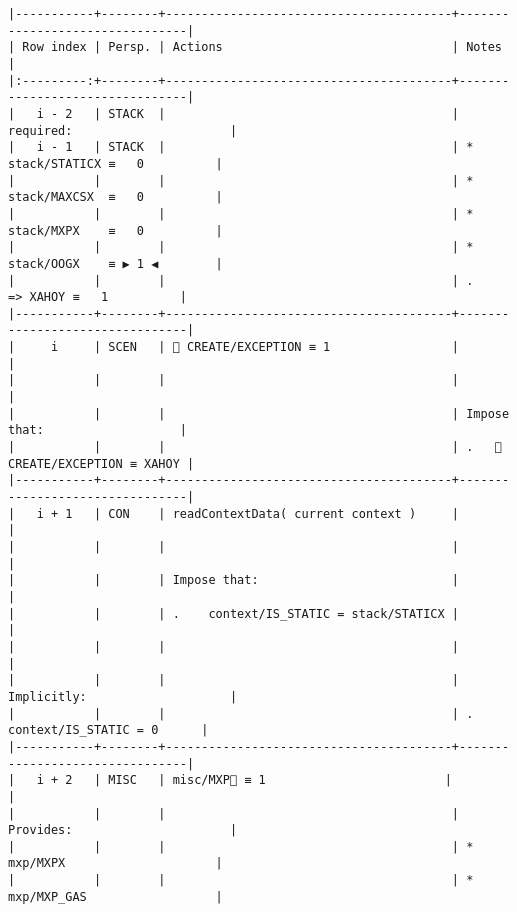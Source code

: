 \documentclass[varwidth=\maxdimen,margin=0.5cm,multi={verbatim}]{standalone}
\begin{document}
\begin{verbatim}
|-----------+--------+----------------------------------------+--------------------------------|
| Row index | Persp. | Actions                                | Notes                          |
|:---------:+--------+----------------------------------------+--------------------------------|
|   i - 2   | STACK  |                                        | required:                      |
|   i - 1   | STACK  |                                        | * stack/STATICX ≡   0          |
|           |        |                                        | * stack/MAXCSX  ≡   0          |
|           |        |                                        | * stack/MXPX    ≡   0          |
|           |        |                                        | * stack/OOGX    ≡ ▶ 1 ◀        |
|           |        |                                        | .      => XAHOY ≡   1          |
|-----------+--------+----------------------------------------+--------------------------------|
|     i     | SCEN   |  CREATE/EXCEPTION ≡ 1                 |                                |
|           |        |                                        |                                |
|           |        |                                        | Impose that:                   |
|           |        |                                        | .    CREATE/EXCEPTION ≡ XAHOY |
|-----------+--------+----------------------------------------+--------------------------------|
|   i + 1   | CON    | readContextData( current context )     |                                |
|           |        |                                        |                                |
|           |        | Impose that:                           |                                |
|           |        | .    context/IS_STATIC = stack/STATICX |                                |
|           |        |                                        |                                |
|           |        |                                        | Implicitly:                    |
|           |        |                                        | .   context/IS_STATIC = 0      |
|-----------+--------+----------------------------------------+--------------------------------|
|   i + 2   | MISC   | misc/MXP🚩 ≡ 1                         |                                |
|           |        |                                        | Provides:                      |
|           |        |                                        | * mxp/MXPX                     |
|           |        |                                        | * mxp/MXP_GAS                  |

\end{verbatim}
\end{document}
